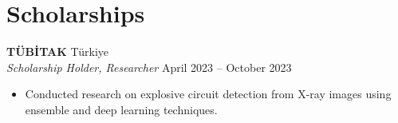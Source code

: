 \documentclass[10pt,a4paper]{extarticle}
\begin{document}
\section{Scholarships}
\textbf{TÜBİTAK} \hfill Türkiye\\
\textit{Scholarship Holder, Researcher} \hfill April 2023 -- October 2023
\begin{itemize}[leftmargin=*,noitemsep,topsep=0pt]
    \item Conducted research on explosive circuit detection from X-ray images using ensemble and deep learning techniques.
\end{itemize}
\end{document}
